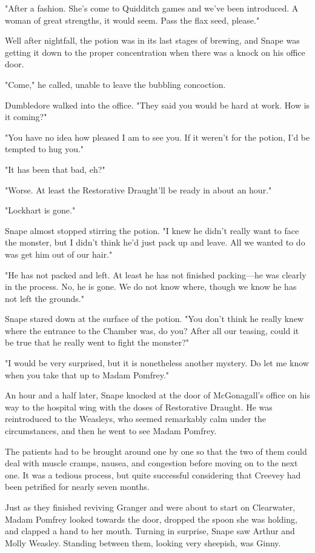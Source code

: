 "After a fashion. She's come to Quidditch games and we've been introduced. A woman of great strengths, it would seem. Pass the flax seed, please."

Well after nightfall, the potion was in its last stages of brewing, and Snape was getting it down to the proper concentration when there was a knock on his office door.

"Come," he called, unable to leave the bubbling concoction.

Dumbledore walked into the office. "They said you would be hard at work. How is it coming?"

"You have no idea how pleased I am to see you. If it weren't for the potion, I'd be tempted to hug you."

"It has been that bad, eh?"

"Worse. At least the Restorative Draught'll be ready in about an hour."

"Lockhart is gone."

Snape almost stopped stirring the potion. "I knew he didn't really want to face the monster, but I didn't think he'd just pack up and leave. All we wanted to do was get him out of our hair."

"He has not packed and left. At least he has not finished packing—he was clearly in the process. No, he is gone. We do not know where, though we know he has not left the grounds."

Snape stared down at the surface of the potion. "You don't think he really knew where the entrance to the Chamber was, do you? After all our teasing, could it be true that he really went to fight the monster?"

"I would be very surprised, but it is nonetheless another mystery. Do let me know when you take that up to Madam Pomfrey."

An hour and a half later, Snape knocked at the door of McGonagall's office on his way to the hospital wing with the doses of Restorative Draught. He was reintroduced to the Weasleys, who seemed remarkably calm under the circumstances, and then he went to see Madam Pomfrey.

The patients had to be brought around one by one so that the two of them could deal with muscle cramps, nausea, and congestion before moving on to the next one. It was a tedious process, but quite successful considering that Creevey had been petrified for nearly seven months.

Just as they finished reviving Granger and were about to start on Clearwater, Madam Pomfrey looked towards the door, dropped the spoon she was holding, and clapped a hand to her mouth. Turning in surprise, Snape saw Arthur and Molly Weasley. Standing between them, looking very sheepish, was Ginny.

